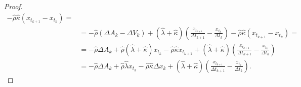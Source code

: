 \begin{appendices}
\begin{proof}
\begin{align*}
			- \hat \rho \hat \kappa (x_{t_{k+1}} - x_{t_{k}}) =                                                                                                                                                               \\
			                                                                          & = -\hat \rho (\Delta A_k - \Delta V_k) +
			(\hat \lambda + \hat \kappa) \left(\frac{x_{t_{k+1}}}{\Delta t_{k+1}} - \frac{x_{t_k}}{\Delta t_{k}}\right)
			- \hat \rho \hat \kappa (x_{t_{k+1}} - x_{t_{k}}) =                                                                                                                                                               \\
			                                                                          & = -\hat \rho \Delta A_k + \hat \rho (\hat \lambda + \hat \kappa) x_{t_k} - \hat \rho \hat \kappa x_{t_{k+1}}
			+ (\hat \lambda + \hat \kappa) \left(\frac{x_{t_{k+1}}}{\Delta t_{k+1}} - \frac{x_{t_k}}{\Delta t_{k}}\right)                                                                                                     \\
			                                                                          & = -\hat \rho \Delta A_k + \hat \rho \hat \lambda x_{t_k} - \hat \rho \hat \kappa \Delta x_k
			+ (\hat \lambda + \hat \kappa) \left(\frac{x_{t_{k+1}}}{\Delta t_{k+1}} - \frac{x_{t_k}}{\Delta t_{k}}\right).
		\end{align*}

	\end{proof}
	\par


\end{appendices}
